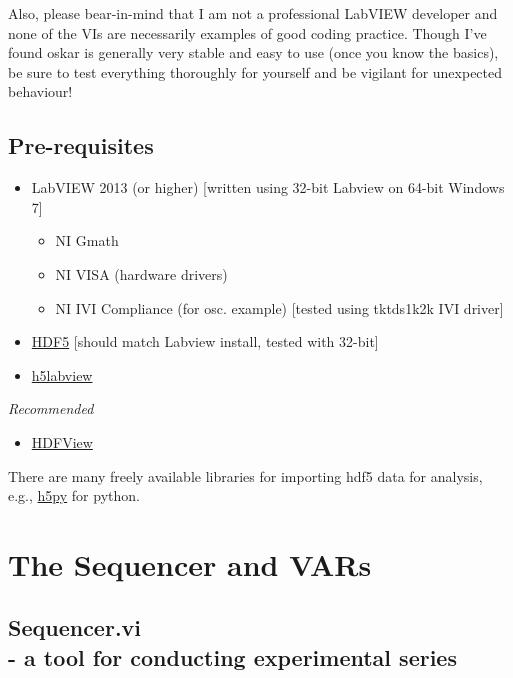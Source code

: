 \documentclass[10pt,a4paper]{article}
\begin{document}
Also, please bear-in-mind that I am not a professional LabVIEW developer and none of the VIs are necessarily examples of good coding practice. Though I've found oskar is generally very stable and easy to use (once you know the basics), be sure to test everything thoroughly for yourself and be vigilant for unexpected behaviour!
\subsection*{Pre-requisites}

\begin{itemize}
\item LabVIEW 2013 (or higher)  [written using 32-bit Labview on 64-bit Windows 7]
	 \begin{itemize}
	 	\item NI Gmath
	 	\item NI VISA (hardware drivers)
	 	\item NI IVI Compliance (for osc. example) [tested using tktds1k2k IVI driver]
	 \end{itemize}

\item  \href{https://www.hdfgroup.org}{HDF5} [should match Labview install, tested with 32-bit]

\item  \href{http://h5labview.sourceforge.net/}{h5labview}

\end{itemize}

\emph{Recommended}
\begin{itemize}
\item  \href{https://www.hdfgroup.org/products/java/hdfview/}{HDFView}
\end{itemize}

There are many freely available libraries for importing hdf5 data for analysis, e.g., \href{http://www.h5py.org/}{h5py} for python.

\section{The Sequencer and VARs}
\subsection[Sequencer.vi]{\label{sex:seq}Sequencer.vi \\ %
	\normalsize - a tool for conducting experimental series}
\end{document}
